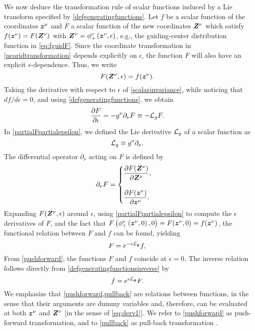 We now deduce the transformation rule of scalar functions induced by a Lie transform specified by \cref{defgeneratingfunctions}.
%
Let $f$ be a scalar function of the coordinates $ \bm{z}^\nu$ and $F$ a scalar function of the new coordinates $\bm{Z}^\nu$ which satisfy $f( \bm{z}^\nu) = F( \bm{Z}^\nu)$ with $ \bm{Z}^\nu =  \phi_+^\nu\left( \bm{z}^\nu, \epsilon\right)$, e.g., the guiding-center distribution function in \cref{eq:fguidF}.
%
Since the coordinate transformation in \cref{nearidtransformation} depends explicitly on $\epsilon$, the function $F$ will also have an explicit $\epsilon$-dependence.
%
Thus, we write
%
\begin{equation} \label{scalarinvariance}
F( \bm{Z}^\nu,\epsilon) = f( \bm{z}^\nu).
\end{equation}
%
Taking the derivative with respect to $\epsilon$ of \cref{scalarinvariance}, while noticing that $d f / d \epsilon = 0$, and using \cref{defgeneratingfunctions}, we obtain
%
\begin{equation} \label{partialFpartialepsilon}
\frac{\partial F}{\partial \epsilon} = - g^\nu \partial_\nu F \equiv - \mathcal{L}_{g} F.
\end{equation}
%
In \cref{partialFpartialepsilon}, we defined the Lie derivative $\mathcal{L}_g$ of a scalar function as
%
\begin{equation} \label{eq:liescalar}
    \mathcal{L}_{g} \equiv g^\nu  \partial_\nu.
\end{equation}
%
The differential operator $\partial_\nu$ acting on $F$ is defined by 
%
\begin{equation}
\partial_\nu F =  \begin{cases}
\dfrac{\partial F(\bm{Z}^\nu)}{\partial \bm{Z}^\nu}, \\	
\\
\dfrac{\partial F(\bm{z}^\nu)}{\partial \bm{z}^\nu}.\end{cases}
\label{eq:derv1}
\end{equation}
%
Expanding $F( \bm{Z}^\nu, \epsilon)$ around $\epsilon$, using \cref{partialFpartialepsilon} to compute the $\epsilon$ derivatives of $F$, and the fact that $F\left(\phi_+^\nu \left( \bm{z}^\nu, 0\right),0\right) = F(\bm{z}^\nu,0) = f(\bm{z}^\nu)$, the functional relation between $F$ and $f$ can be found, yielding
%
\begin{equation} \label{pushforward}
F = e^{ - \epsilon\mathcal{L}_{\bm{g}} } f,
\end{equation}
%
From \cref{pushforward}, the functions $F$ and $f$ coincide at $\epsilon =0$.
%
The inverse relation follows directly from \cref{defgeneratingfunctionsinverse} by 
%
\begin{equation}\label{pullback}
f= e^{\epsilon \mathcal{L}_{\bm{g}} } F.
\end{equation}
%
We emphasize that \cref{pushforward,pullback} are relations between functions, in the sense that their arguments are dummy variables and, therefore, can be evaluated at both $ \bm{z}^\nu$ and $\bm{Z}^\nu$ [in the sense of \cref{eq:derv1}].
%
We refer to \cref{pushforward} as push-forward transformation, and to \cref{pullback} as pull-back transformation \citep{Brizard2009}. 

